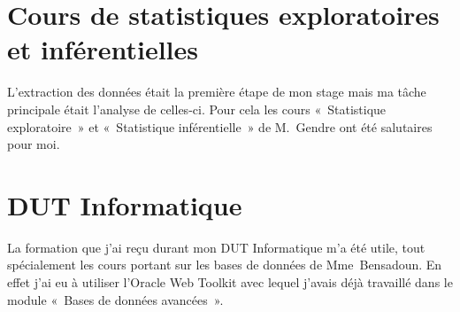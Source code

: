 	
	\section{Cours de statistiques exploratoires et inférentielles}
		L'extraction des données était la première étape de mon stage mais ma tâche principale était l'analyse de celles-ci. Pour cela les cours «~Statistique exploratoire~» et «~Statistique inférentielle~» de M.~Gendre ont été salutaires pour moi.
	
	
	\section{DUT Informatique}
		La formation que j'ai reçu durant mon DUT Informatique m'a été utile, tout spécialement les cours portant sur les bases de données de Mme~Bensadoun. En effet j'ai eu à utiliser l'Oracle Web Toolkit avec lequel j'avais déjà travaillé dans le module «~Bases de données avancées~».
